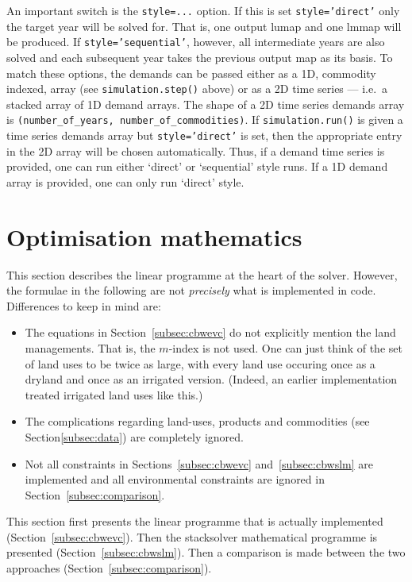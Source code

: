 \documentclass[12pt,a4paper,twoside]{article}
\begin{document}
An important switch is the \texttt{style=...} option. If this is set \texttt{style='direct'} only the target year will be solved for. That is, one output lumap and one lmmap will be produced. If \texttt{style='sequential'}, however, all intermediate years are also solved and each subsequent year takes the previous output map as its basis. To match these options, the demands can be passed either as a 1D, commodity indexed, array (see \texttt{simulation.step()} above) or as a 2D time series --- i.e.\ a stacked array of 1D demand arrays. The shape of a 2D time series demands array is \texttt{(number_of_years, number_of_commodities)}. If \texttt{simulation.run()} is given a time series demands array but \texttt{style='direct'} is set, then the appropriate entry in the 2D array will be chosen automatically. Thus, if a demand time series is provided, one can run either `direct' or `sequential' style runs. If a 1D demand array is provided, one can only run `direct' style.

\newpage
\section{Optimisation mathematics}\label{sec:mathematics}

This section describes the linear programme at the heart of the solver. However, the formulae in the following are not \emph{precisely} what is implemented in code. Differences to keep in mind are:
\begin{itemize}
	\item The equations in Section~\ref{subsec:cbwevc} do not explicitly mention the land managements. That is, the $m$-index is not used. One can just think of the set of land uses to be twice as large, with every land use occuring once as a dryland and once as an irrigated version. (Indeed, an earlier implementation treated irrigated land uses like this.)
	\item The complications regarding land-uses, products and commodities (see Section\ref{subsec:data}) are completely ignored.
	\item Not all constraints in Sections~\ref{subsec:cbwevc} and~\ref{subsec:cbwslm} are implemented and all environmental constraints are ignored in Section~\ref{subsec:comparison}.
\end{itemize}

This section first presents the linear programme that is actually implemented (Section~\ref{subsec:cbwevc}). Then the stacksolver mathematical programme is presented (Section~\ref{subsec:cbwslm}). Then a comparison is made between the two approaches (Section~\ref{subsec:comparison}).
\end{document}
